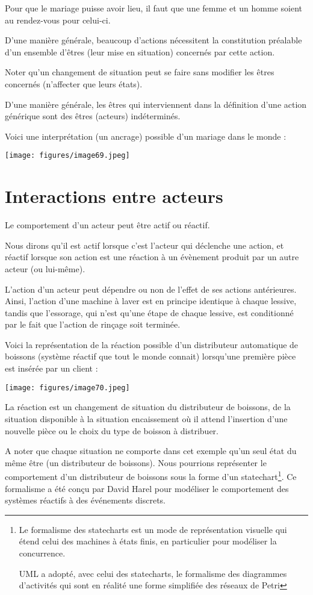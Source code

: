 \documentclass[a4paper, 12pt, openright, french]{book}
\begin{document}
Pour que le mariage puisse avoir lieu, il faut que une femme et un homme
soient au rendez-vous pour celui-ci.

D'une manière générale, beaucoup
d'actions nécessitent la constitution préalable
d'un ensemble d'êtres (leur mise en
situation) concernés par cette action.

Noter qu'un changement de situation peut se faire sans
modifier les êtres concernés (n'affecter que leurs
états).

D'une manière générale, les êtres qui interviennent dans
la définition d'une action générique sont des êtres
(acteurs) indéterminés.

Voici une interprétation (un ancrage) possible d'un
mariage dans le monde :

\texttt{[image: figures/image69.jpeg]}

\section{Interactions entre acteurs}

Le comportement d'un acteur peut être actif ou réactif.

Nous dirons qu'il est actif lorsque
c'est l'acteur qui déclenche une action,
et réactif lorsque son action est une réaction à un évènement produit
par un autre acteur (ou lui-même).

L'action d'un acteur peut dépendre ou
non de l'effet de ses actions antérieures. Ainsi,
l'action d'une machine à laver est en
principe identique à chaque lessive, tandis que
l'essorage, qui n'est
qu'une étape de chaque lessive, est conditionné par le
fait que l'action de rinçage soit terminée.

Voici la représentation de la réaction possible d'un
distributeur automatique de boissons (système réactif que tout le monde
connait) lorsqu'une première pièce est insérée par un
client :

\texttt{[image: figures/image70.jpeg]}

La réaction est un changement de situation du distributeur de boissons,
de la situation disponible à la situation encaissement où il attend
l'insertion d'une nouvelle pièce ou le
choix du type de boisson à distribuer. 

A noter que chaque situation ne
comporte dans cet exemple qu'un seul état du même être
(un distributeur de boissons). Nous pourrions représenter le comportement d'un distributeur de boissons sous la forme d'un 
statechart\footnote{Le formalisme des statecharts est un mode de
	représentation visuelle qui étend celui des machines à états finis, en
	particulier pour modéliser la concurrence.
	
	UML a adopté, avec celui des statecharts, le formalisme des diagrammes
	d'activités qui sont en réalité une forme simplifiée des
	réseaux de Petri}. Ce formalisme a été conçu par David
Harel pour modéliser le comportement des systèmes réactifs à des
événements discrets.
\end{document}
